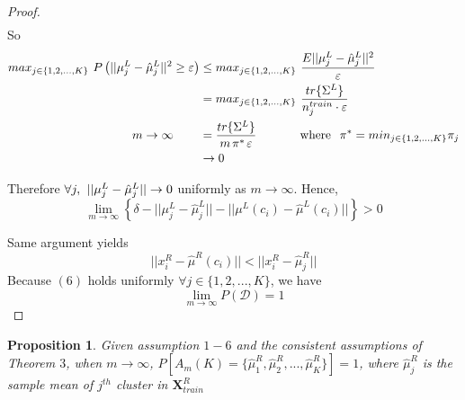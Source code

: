 \documentclass[11pt]{article}
\newtheorem{proposition}{Proposition}
\begin{document}
\begin{proof}
\begin{align}
	\end{align} 
So
\begin{align} \nonumber
  max_{j \in \{1,2,...,K\}} \hspace{0.05in} P\left(||\mu^L_{j}-\hat{\mu}^L_{j}||^2 \geq \varepsilon \right) &\leq max_{j \in \{1,2,...,K\}} \hspace{0.05in}\frac{E||\mu^L_{j}-\hat{\mu}^L_{j}||^2}{\varepsilon}  \nonumber \\ \nonumber
  &=max_{j \in \{1,2,...,K\}} \hspace{0.05in}  \frac{ tr\{\Sigma^L \}}{n^{train}_j \cdot \varepsilon}   \\ \nonumber
m \to \infty \hspace{0.3in}  &= \frac{ tr\{\Sigma^L \}}{m\hspace{0.02in}\pi^*\hspace{0.02in} \varepsilon}  \hspace{0.5in} \text{where}\hspace{0.1in}\pi^* = min_{j \in \{1,2,...,K\}}\pi_j\\ \nonumber
&\to 0
\end{align} 

Therefore $\forall j, \hspace{0.05in} ||\mu^L_{j}-\hat{\mu}^L_{j}|| \to 0$ uniformly as $m \to \infty$. Hence, 
\begin{equation}
\lim_{m\to \infty} \left\lbrace \delta-||\mu^L_{j}-\hat{\mu}^L_{j}|| -||\mu^L \left(c_i\right)-\hat{\mu}^L \left(c_i\right) || \right\rbrace >0
\end{equation}

Same argument yields 
\[||x^R_i-\hat{\mu}^R \left(c_i\right)|| < ||x^R_i-\hat{\mu}^R_{j}||\]
Because $(6)$ holds uniformly $\forall j\in\{1,2,...,K\}$, we have 
\[ \lim_{m \to \infty}P(\mathcal{D})  =1\]
	\end{proof}
\begin{proposition}
Given assumption $1-6$ and the consistent assumptions of Theorem $3$, when $m \to \infty$, $P\left[A_m(K) = \{\hat{\mu}^R_1,\hat{\mu}^R_2,...,\hat{\mu}^R_K \}\right]=1$, where $\hat{\mu}^R_j$ is the sample mean of $j^{th}$ cluster in $\mathbf{X}^R_{train}$
\end{proposition}
\end{document}
